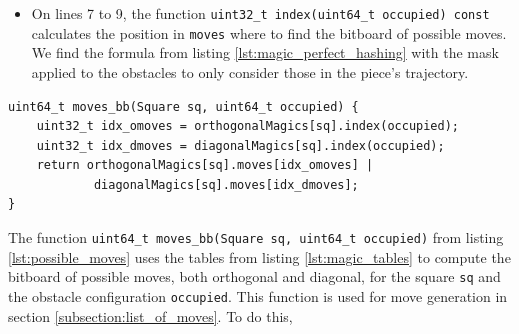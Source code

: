 \documentclass[12pt,a4paper,twoside,openright]{book}
\begin{document}
\begin{itemize}
\item On lines 7 to 9, the function \texttt{uint32_t index(uint64_t occupied) const} calculates the position in \texttt{moves} where to find the bitboard of possible moves. We find the formula from listing \ref{lst:magic_perfect_hashing} with the mask applied to the obstacles to only consider those in the piece's trajectory.

\end{itemize}

\begin{mdframed}[skipabove=\baselineskip,hidealllines=true]
\begin{verbatim}
uint64_t moves_bb(Square sq, uint64_t occupied) {
    uint32_t idx_omoves = orthogonalMagics[sq].index(occupied);
    uint32_t idx_dmoves = diagonalMagics[sq].index(occupied);
    return orthogonalMagics[sq].moves[idx_omoves] | 
            diagonalMagics[sq].moves[idx_dmoves];
}
\end{verbatim}
\label{lst:possible_moves}
\end{mdframed}

The function \texttt{uint64_t moves_bb(Square sq, uint64_t occupied)} from listing \ref{lst:possible_moves} uses the tables from listing \ref{lst:magic_tables} to compute the bitboard of possible moves, both orthogonal and diagonal, for the square \texttt{sq} and the obstacle configuration \texttt{occupied}. This function is used for move generation in section \ref{subsection:list_of_moves}. To do this,
\end{document}
